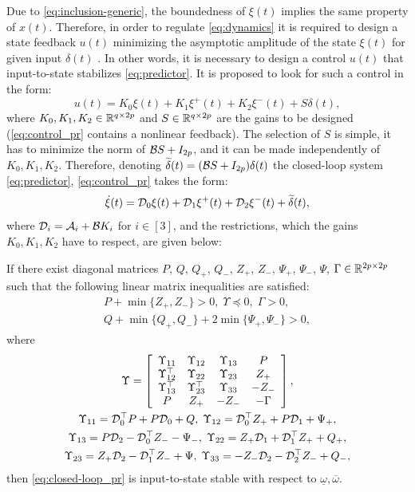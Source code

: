 \documentclass[letterpaper, 10 pt, conference]{ieeeconf}  %
\begin{document}
Due to \eqref{eq:inclusion-generic}, the boundedness of $\xi(t)$
implies the same property of $x(t)$. Therefore, in order to regulate
\eqref{eq:dynamics} it is required to design a state feedback $u(t)$
minimizing the asymptotic amplitude of the state $\xi(t)$ for given
input $\delta(t)$ \cite{Efimov2013a}. In other words, it is necessary
to design a control $u(t)$ that input-to-state stabilizes \eqref{eq:predictor}.
It is proposed to look for such a control in the form:
\begin{equation}
u(t)=K_{0}\xi(t)+K_{1}\xi^{+}(t)+K_{2}\xi^{-}(t)+S\delta(t),\label{eq:control_pr}
\end{equation}
where $K_{0},K_{1},K_{2}\in\mathbb{R}^{q\times2p}$ and $S\in\mathbb{R}^{q\times2p}$
are the gains to be designed (\eqref{eq:control_pr} contains a nonlinear
feedback). The selection of $S$ is simple, it has to minimize the
norm of $\mathcal{B} S+I_{2p}$, and it can be made independently of $K_{0},K_{1},K_{2}$.
Therefore, denoting $\widetilde{\delta}(t)=(\mathcal{B} S+I_{2p})\delta(t)$ the
closed-loop system \eqref{eq:predictor}, \eqref{eq:control_pr} takes
the form:
\begin{equation}
\dot{\xi}(t)=\mathcal{D}_{0}\xi(t)+\mathcal{D}_{1}\xi^{+}(t)+\mathcal{D}_{2}\xi^{-}(t)+\widetilde{\delta}(t),\label{eq:closed-loop_pr}
\end{equation}
where $\mathcal{D}_{i}=\mathcal{A}_{i}+\mathcal{B} K_{i}$ for $i\in[3]$, and the restrictions,
which the gains $K_{0},K_{1},K_{2}$ have to respect, are given below:
\begin{theorem}
\label{thm:ISS_pr} If there exist diagonal matrices $P$, $Q$, $Q_{+}$,
$Q_{-}$, $Z_{+}$, $Z_{-}$, $\Psi_{+}$, $\Psi_{-}$, $\Psi$, $\Gamma\in\mathbb{R}^{2p\times2p}$
such that the following linear matrix inequalities are satisfied:
\begin{gather*}
P+\min\{Z_{+},Z_{-}\}>0,\;\Upsilon\preceq0,\;\Gamma>0,\\
Q+\min\{Q_{+},Q_{-}\}+2\min\{\Psi_{+},\Psi_{-}\}>0,
\end{gather*}
where
\begin{gather*}
\Upsilon=\left[\begin{array}{cccc}
\Upsilon_{11} & \Upsilon_{12} & \Upsilon_{13} & P\\
\Upsilon_{12}^{\top} & \Upsilon_{22} & \Upsilon_{23} & Z_{+}\\
\Upsilon_{13}^{\top} & \Upsilon_{23}^{\top} & \Upsilon_{33} & -Z_{-}\\
P & Z_{+} & -Z_{-} & -\Gamma
\end{array}\right],\\
\Upsilon_{11}=\mathcal{D}_{0}^{\top}P+P\mathcal{D}_{0}+Q,\;\Upsilon_{12}=\mathcal{D}_{0}^{\top}Z_{+}+P\mathcal{D}_{1}+\Psi_{+},\\
\Upsilon_{13}=P\mathcal{D}_{2}-\mathcal{D}_{0}^{\top}Z_{-}-\Psi_{-},\;\Upsilon_{22}=Z_{+}\mathcal{D}_{1}+\mathcal{D}_{1}^{\top}Z_{+}+Q_{+},\\
\Upsilon_{23}=Z_{+}\mathcal{D}_{2}-\mathcal{D}_{1}^{\top}Z_{-}+\Psi,\;\Upsilon_{33}=-Z_{-}\mathcal{D}_{2}-\mathcal{D}_{2}^{\top}Z_{-}+Q_{-},
\end{gather*}
then \eqref{eq:closed-loop_pr} is input-to-state stable with respect
to $\underline{\omega},\overline{\omega}$.
\end{theorem}
\end{document}
